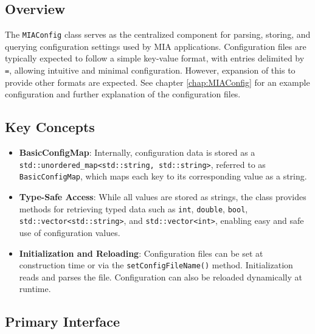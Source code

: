 \subsection{Overview}

The \texttt{MIAConfig} class serves as the centralized component for parsing, storing, and querying configuration settings used by MIA applications. Configuration files are typically expected to follow a simple key-value format, with entries delimited by \texttt{=}, allowing intuitive and minimal configuration. However, expansion of this to provide other formats are expected. See chapter \ref{chap:MIAConfig} for an example configuration and further explanation of the configuration files.

\subsection{Key Concepts}

\begin{itemize}
	\item \textbf{BasicConfigMap}: Internally, configuration data is stored as a \texttt{std::unordered\_map<std::string, std::string>}, referred to as \texttt{BasicConfigMap}, which maps each key to its corresponding value as a string.
	
	\item \textbf{Type-Safe Access}: While all values are stored as strings, the class provides methods for retrieving typed data such as \texttt{int}, \texttt{double}, \texttt{bool}, \texttt{std::vector<std::string>}, and \texttt{std::vector<int>}, enabling easy and safe use of configuration values.
	
	\item \textbf{Initialization and Reloading}: Configuration files can be set at construction time or via the \texttt{setConfigFileName()} method. Initialization reads and parses the file. Configuration can also be reloaded dynamically at runtime.
\end{itemize}

\subsection{Primary Interface}

